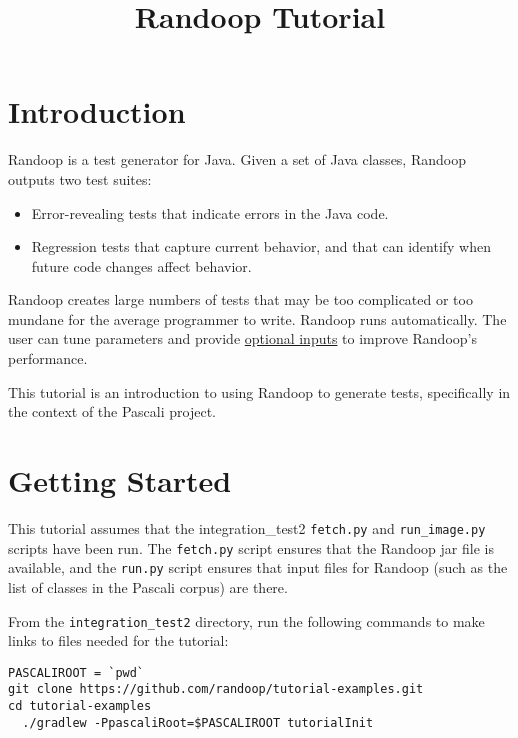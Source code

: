 \documentclass[11pt, oneside]{article} %
\title{Randoop Tutorial}
\newcommand{\cmd}[1]{{\texttt{#1}}}
\begin{document}
\maketitle

\section{Introduction}
Randoop is a test generator for Java.
Given a set of Java classes, Randoop outputs two test suites:
\begin{itemize}
\item Error-revealing tests that indicate errors in the Java code.
\item Regression tests that capture current behavior, and that can identify
  when future code changes affect behavior.
\end{itemize}
Randoop creates large numbers of tests that may be too complicated or too
mundane for the average programmer to write.
Randoop runs automatically.  The user can tune parameters and provide
\href{https://randoop.github.io/randoop/manual/#command-line-options}{optional inputs} to improve Randoop's performance.

This tutorial is an introduction to using Randoop to generate tests, specifically in the context of the Pascali project.

\section{Getting Started}
This tutorial assumes that the integration\_test2 \cmd{fetch.py} and \cmd{run\_image.py}
scripts have been run.
The \cmd{fetch.py} script ensures that the Randoop jar file is available,
and the \cmd{run.py} script ensures that input files for Randoop (such as
the list of classes in the Pascali corpus) are there.

From the \texttt{integration\_test2} directory, run the
following commands to make links to files needed for the tutorial:
\begin{verbatim}
PASCALIROOT = `pwd`
git clone https://github.com/randoop/tutorial-examples.git
cd tutorial-examples
  ./gradlew -PpascaliRoot=$PASCALIROOT tutorialInit 
\end{verbatim}
\end{document}
